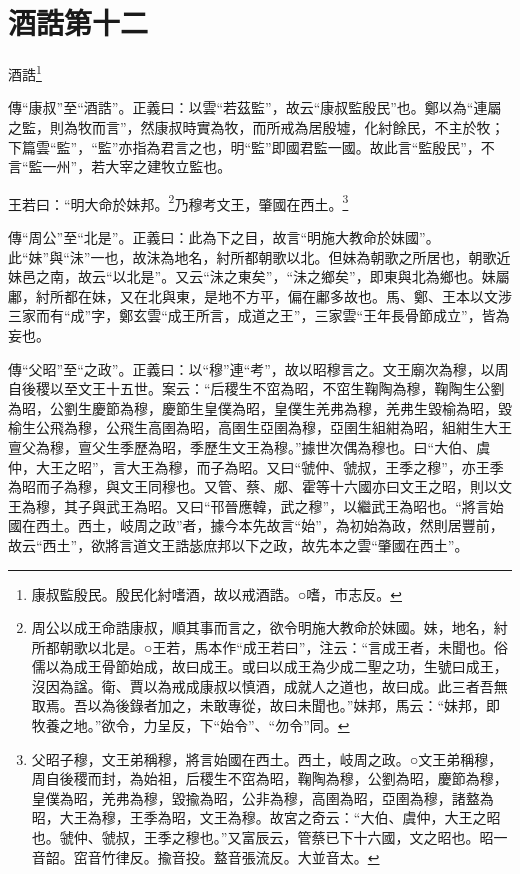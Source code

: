 \section{酒誥第十二}


酒誥\footnote{康叔監殷民。殷民化紂嗜酒，故以戒酒誥。○嗜，巿志反。}

{\noindent\shu{}\fzkt 傳“康叔”至“酒誥”。正義曰：以雲“若茲監”，故云“康叔監殷民”也。鄭以為“連屬之監，則為牧而言”，然康叔時實為牧，而所戒為居殷墟，化紂餘民，不主於牧；下篇雲“監”，“監”亦指為君言之也，明“監”即國君監一國。故此言“監殷民”，不言“監一州”，若大宰之建牧立監也。 \par}

王若曰：“明大命於妹邦。\footnote{周公以成王命誥康叔，順其事而言之，欲令明施大教命於妹國。妹，地名，紂所都朝歌以北是。○王若，馬本作“成王若曰”，注云：“言成王者，未聞也。俗儒以為成王骨節始成，故曰成王。或曰以成王為少成二聖之功，生號曰成王，沒因為諡。衛、賈以為戒成康叔以慎酒，成就人之道也，故曰成。此三者吾無取焉。吾以為後錄者加之，未敢專從，故曰未聞也。”妹邦，馬云：“妹邦，即牧養之地。”欲令，力呈反，下“始令”、“勿令”同。}乃穆考文王，肇國在西土。\footnote{父昭子穆，文王弟稱穆，將言始國在西土。西土，岐周之政。○文王弟稱穆，周自後稷而封，為始祖，后稷生不窋為昭，鞠陶為穆，公劉為昭，慶節為穆，皇僕為昭，羌弗為穆，毀揄為昭，公非為穆，高圉為昭，亞圉為穆，諸盩為昭，大王為穆，王季為昭，文王為穆。故宮之奇云：“大伯、虞仲，大王之昭也。虢仲、虢叔，王季之穆也。”又富辰云，管蔡已下十六國，文之昭也。昭一音韶。窋音竹律反。揄音投。盩音張流反。大並音太。}


{\noindent\zhuan{}\fzbyks 傳“周公”至“北是”。正義曰：此為下之目，故言“明施大教命於妹國”。此“妹”與“沬”一也，故沬為地名，紂所都朝歌以北。但妹為朝歌之所居也，朝歌近妹邑之南，故云“以北是”。又云“沬之東矣”，“沬之鄉矣”，即東與北為鄉也。妹屬鄘，紂所都在妹，又在北與東，是地不方平，偏在鄘多故也。馬、鄭、王本以文涉三家而有“成”字，鄭玄雲“成王所言，成道之王”，三家雲“王年長骨節成立”，皆為妄也。 \par}

{\noindent\zhuan{}\fzbyks 傳“父昭”至“之政”。正義曰：以“穆”連“考”，故以昭穆言之。文王廟次為穆，以周自後稷以至文王十五世。案云：“后稷生不窋為昭，不窋生鞠陶為穆，鞠陶生公劉為昭，公劉生慶節為穆，慶節生皇僕為昭，皇僕生羌弗為穆，羌弗生毀榆為昭，毀榆生公飛為穆，公飛生高圉為昭，高圉生亞圉為穆，亞圉生組紺為昭，組紺生大王亶父為穆，亶父生季歷為昭，季歷生文王為穆。”據世次偶為穆也。曰“大伯、虞仲，大王之昭”，言大王為穆，而子為昭。又曰“虢仲、虢叔，王季之穆”，亦王季為昭而子為穆，與文王同穆也。又管、蔡、郕、霍等十六國亦曰文王之昭，則以文王為穆，其子與武王為昭。又曰“邗晉應韓，武之穆”，以繼武王為昭也。“將言始國在西土。西土，岐周之政”者，據今本先故言“始”，為初始為政，然則居豐前，故云“西土”，欲將言道文王誥毖庶邦以下之政，故先本之雲“肇國在西土”。 \par}

